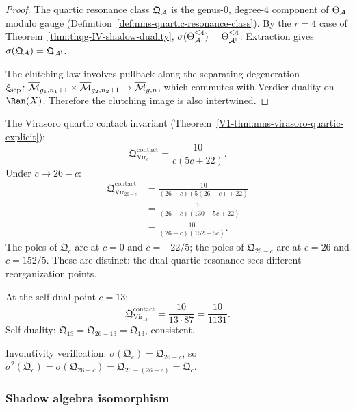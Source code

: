 \begin{proof}
The quartic resonance class $\mathfrak{Q}_{\mathcal{A}}$ is the genus-$0$,
degree-$4$ component of $\Theta_{\mathcal{A}}$ modulo gauge
(Definition~\ref{def:nms-quartic-resonance-class}). By the $r = 4$
case of Theorem~\ref{thm:thqg-IV-shadow-duality},
$\sigma(\Theta_{\mathcal{A}}^{\leq 4}) = \Theta_{\mathcal{A}^!}^{\leq 4}$.
Extraction gives $\sigma(\mathfrak{Q}_{\mathcal{A}}) = \mathfrak{Q}_{\mathcal{A}^!}$.

The clutching law involves pullback along the separating degeneration
$\xi_{\mathrm{sep}}\colon
\overline{\mathcal{M}}_{g_1,n_1+1} \times \overline{\mathcal{M}}_{g_2,n_2+1}
\to \overline{\mathcal{M}}_{g,n}$, which commutes with Verdier duality
on $\Ran(X)$. Therefore the clutching image is also intertwined.
\end{proof}

\begin{computation}
The Virasoro quartic contact invariant (Theorem~\ref{V1-thm:nms-virasoro-quartic-explicit}):
\[
\mathfrak{Q}^{\mathrm{contact}}_{\mathrm{Vir}_c}
= \frac{10}{c(5c + 22)}.
\]
Under $c \mapsto 26 - c$:
\begin{align*}
\mathfrak{Q}^{\mathrm{contact}}_{\mathrm{Vir}_{26-c}}
&= \frac{10}{(26-c)(5(26-c) + 22)} \\[4pt]
&= \frac{10}{(26-c)(130-5c+22)} \\[4pt]
&= \frac{10}{(26-c)(152-5c)}.
\end{align*}
The poles of $\mathfrak{Q}_c$ are at $c = 0$ and $c = -22/5$;
the poles of $\mathfrak{Q}_{26-c}$ are at $c = 26$ and $c = 152/5$.
These are distinct: the dual quartic resonance sees different
reorganization points.

At the self-dual point $c = 13$:
\[
\mathfrak{Q}^{\mathrm{contact}}_{\mathrm{Vir}_{13}}
= \frac{10}{13 \cdot 87}
= \frac{10}{1131}.
\]
Self-duality: $\mathfrak{Q}_{13} = \mathfrak{Q}_{26-13} = \mathfrak{Q}_{13}$,
consistent.

Involutivity verification:
$\sigma(\mathfrak{Q}_c) = \mathfrak{Q}_{26-c}$, so
$\sigma^2(\mathfrak{Q}_c)
= \sigma(\mathfrak{Q}_{26-c})
= \mathfrak{Q}_{26-(26-c)}
= \mathfrak{Q}_c$.
\end{computation}

\subsubsection{Shadow algebra isomorphism}

